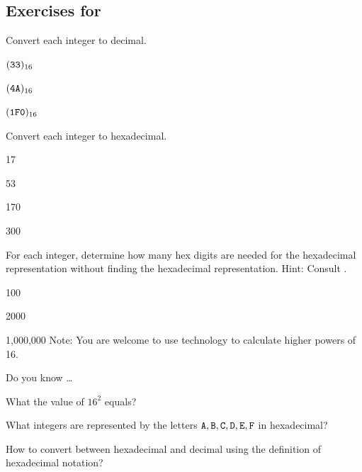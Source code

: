 
\subsection*{Exercises for  \subhex}

\begin{exer}[\exerP] %
\label{exer_conv_from_hex}
    Convert each integer to decimal.
    \begin{exerpart}
        \item $(\texttt{33})_{16}$
        \item $(\texttt{4A})_{16}$
        \item $(\texttt{1F0})_{16}$
    \end{exerpart}
\end{exer}

\begin{exer}[\exerP] %
\label{exer_conv_to_hex}
    Convert each integer to hexadecimal.
    \begin{exerpart}
        \item 17
        \item 53
        \item 170
        \item 300
    \end{exerpart}
\end{exer}

\begin{exer}[\exerU] %
\label{exer_count_bits_hex}
    For each integer, determine how many hex digits are needed for the hexadecimal representation without finding the hexadecimal representation. Hint: Consult .
        \begin{exerpart}
            \item 100
            \item 2000
            \item 1,000,000   Note: You are welcome to use technology to calculate higher powers of 16.
        \end{exerpart}
\end{exer}

\begin{exer}[\exerR] %
\label{exer_dyk_hex_rep}
    Do you know \ldots
        \begin{exerpart}
        \item What the value of $16^2$ equals?
        \item What integers are represented by the letters $\texttt{A},\texttt{B},\texttt{C},\texttt{D},\texttt{E},\texttt{F}$ in hexadecimal?
        \item How to convert between hexadecimal and decimal using the definition of hexadecimal notation?
        \end{exerpart}
\end{exer}

